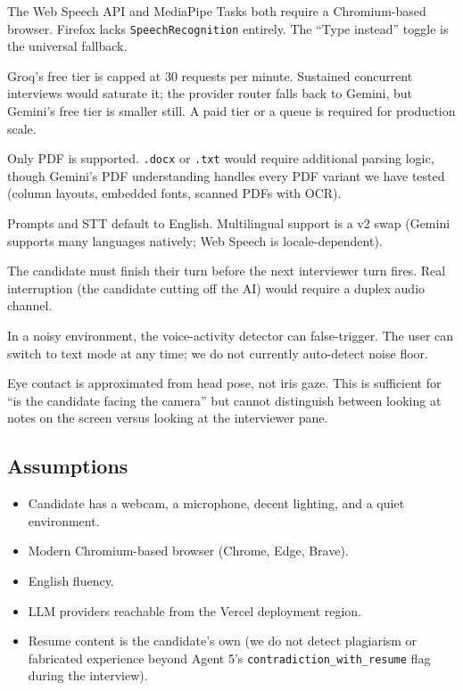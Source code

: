 \documentclass[11pt,a4paper]{article}
\begin{document}
\begin{description}[style=nextline]
  \item[Browser support.] The Web Speech API and MediaPipe Tasks both
        require a Chromium-based browser. Firefox lacks \texttt{SpeechRecognition}
        entirely. The ``Type instead'' toggle is the universal fallback.
  \item[Concurrency.] Groq's free tier is capped at 30 requests per
        minute. Sustained concurrent interviews would saturate it; the
        provider router falls back to Gemini, but Gemini's free tier is
        smaller still. A paid tier or a queue is required for production
        scale.
  \item[Resume formats.] Only PDF is supported. \texttt{.docx} or
        \texttt{.txt} would require additional parsing logic, though
        Gemini's PDF understanding handles every PDF variant we have
        tested (column layouts, embedded fonts, scanned PDFs with OCR).
  \item[Single language.] Prompts and STT default to English. Multilingual
        support is a v2 swap (Gemini supports many languages natively;
        Web Speech is locale-dependent).
  \item[No real-time interruption.] The candidate must finish their turn
        before the next interviewer turn fires. Real interruption (the
        candidate cutting off the AI) would require a duplex audio
        channel.
  \item[VAD sensitivity.] In a noisy environment, the voice-activity
        detector can false-trigger. The user can switch to text mode at
        any time; we do not currently auto-detect noise floor.
  \item[Vision baseline.] Eye contact is approximated from head pose,
        not iris gaze. This is sufficient for ``is the candidate facing
        the camera'' but cannot distinguish between looking at notes
        on the screen versus looking at the interviewer pane.
\end{description}

\subsection{Assumptions}

\begin{itemize}
  \item Candidate has a webcam, a microphone, decent lighting, and a
        quiet environment.
  \item Modern Chromium-based browser (Chrome, Edge, Brave).
  \item English fluency.
  \item LLM providers reachable from the Vercel deployment region.
  \item Resume content is the candidate's own (we do not detect plagiarism
        or fabricated experience beyond Agent 5's
        \texttt{contradiction\_with\_resume} flag during the interview).
\end{itemize}
\end{document}
